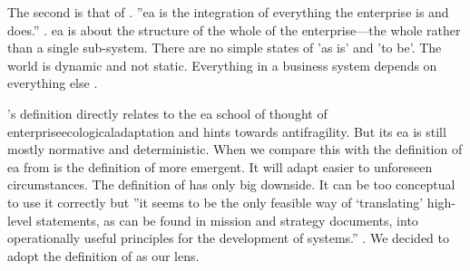 The second is that of \textcite{Graves2008}. ''\acrlong{ea} is the integration of everything the enterprise is and does.'' \parencite[p.~1]{Graves2008}. \acrlong{ea} is about the structure of the whole of the enterprise—the whole rather than a single sub-system. There are no simple states of 'as is' and 'to be'. The world is dynamic and not static. Everything in a business system depends on everything else \parencite[p.~14]{Graves2008}.

\citeauthor{Graves2008}'s definition directly relates to the \acrlong{ea} school of thought of \gls{enterpriseecologicaladaptation} and hints towards \gls{antifragility}. But its \acrlong{ea} is still mostly normative and deterministic. When we compare this with the definition of \acrlong{ea} from \textcite{Dietz2008} is the definition of \citeauthor{Dietz2008} more emergent. It will adapt easier to unforeseen circumstances. The definition of \textcite{Dietz2008} has only big downside. It can be too conceptual to use it correctly but ''it seems to be the only feasible way of ‘translating’ high-level statements, as can be found in mission and strategy documents, into operationally useful principles for the development of systems.'' \parencite[p.~53]{Dietz2008}. We decided to adopt the definition of \textcite{Dietz2008} as our lens.

